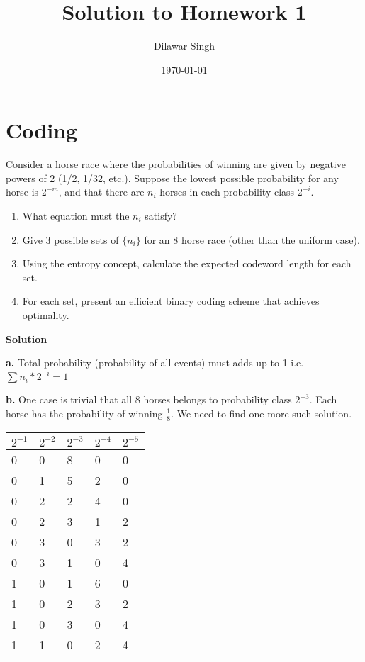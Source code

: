\documentclass[]{article}
\title{Solution to Homework 1}
\author{Dilawar Singh}
\date{\today}
\providecommand{\tightlist}{%
\setlength{\itemsep}{0pt}\setlength{\parskip}{0pt}}
\begin{document}
\maketitle

\section{Coding}\label{coding}

Consider a horse race where the probabilities of winning are given by
negative powers of 2 (1/2, 1/32, etc.). Suppose the lowest possible
probability for any horse is \(2^{-m}\), and that there are \(n_i\)
horses in each probability class \(2^{-i}\).

\begin{enumerate}
\def\labelenumi{\alph{enumi}.}
\tightlist
\item
  What equation must the \(n_i\) satisfy?
\item
  Give 3 possible sets of \(\{n_i\}\) for an 8 horse race (other than
  the uniform case).
\item
  Using the entropy concept, calculate the expected codeword length for
  each set.
\item
  For each set, present an efficient binary coding scheme that achieves
  optimality.
\end{enumerate}

\textbf{Solution}

\textbf{a.} Total probability (probability of all events) must adds up
to 1 i.e. \(\sum n_i * 2^{-i} = 1\)

\textbf{b.} One case is trivial that all 8 horses belongs to probability
class \(2^{-3}\). Each horse has the probability of winning
\(\frac{1}{8}\). We need to find one more such solution.

\begin{longtable}[]{@{}lllll@{}}
\toprule
\(2^{-1}\) & \(2^{-2}\) & \(2^{-3}\) & \(2^{-4}\) &
\(2^{-5}\)\tabularnewline
\midrule
\endhead
0 & 0 & 8 & 0 & 0\tabularnewline
0 & 1 & 5 & 2 & 0\tabularnewline
0 & 2 & 2 & 4 & 0\tabularnewline
0 & 2 & 3 & 1 & 2\tabularnewline
0 & 3 & 0 & 3 & 2\tabularnewline
0 & 3 & 1 & 0 & 4\tabularnewline
1 & 0 & 1 & 6 & 0\tabularnewline
1 & 0 & 2 & 3 & 2\tabularnewline
1 & 0 & 3 & 0 & 4\tabularnewline
1 & 1 & 0 & 2 & 4\tabularnewline
\bottomrule
\end{longtable}
\end{document}
